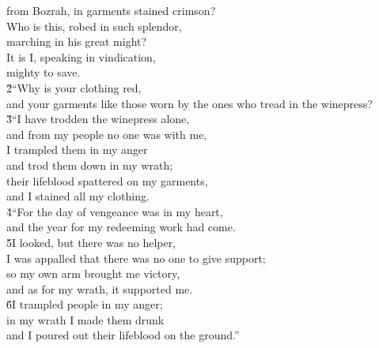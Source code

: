 \begin{poetry}
\poemll    from Bozrah, in garments stained crimson? \\
\poeml Who is this, robed in such splendor, \\
\poemll    marching in his great might? \\
\poeml It is I, speaking in vindication, \\
\poemll    mighty to save. \\
\poeml \v{2}``Why is your clothing red, \\
\poemll    and your garments like those worn by the ones who tread in the winepress? \\
\poeml \v{3}``I have trodden the winepress alone, \\
\poemll    and from my people no one was with me, \\
\poeml I trampled them in my anger \\
\poemll    and trod them down in my wrath; \\
\poeml their lifeblood spattered on my garments, \\
\poemll    and I stained all my clothing. \\
\poeml \v{4}``For the day of vengeance was in my heart, \\
\poemll    and the year for my redeeming work had come. \\
\poeml \v{5}I looked, but there was no helper, \\
\poemll    I was appalled that there was no one to give support; \\
\poeml so my own arm brought me victory, \\
\poemll    and as for my wrath, it supported me. \\
\poeml \v{6}I trampled people in my anger; \\
\poemll    in my wrath I made them drunk \\
\poemlll       and I poured out their lifeblood on the ground.''

\end{poetry}
